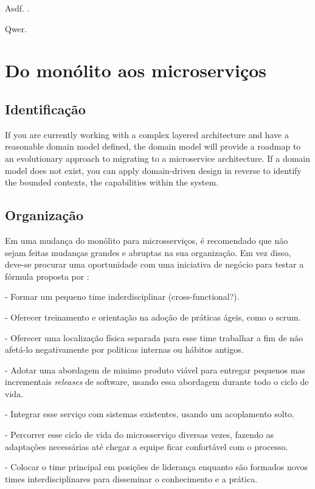 Asdf. \cite{oracle_microservices}.

Qwer. \cite{12factor}

\section{Do monólito aos microserviços}

\subsection{Identificação}

If you are currently working with a complex layered architecture and have a reasonable domain model defined, the domain model will provide a roadmap to an evolutionary approach to migrating to a microservice architecture. If a domain model does not exist, you can apply domain-driven design in reverse to identify the bounded contexts, the capabilities within the system. \cite{Familiar2015}


\subsection{Organização}

Em uma mudança do monólito para microsserviços, é recomendado que não sejam feitas mudanças grandes e abruptas na sua organização. Em vez disso, deve-se procurar uma oportunidade com uma iniciativa de negócio para testar a fórmula proposta por  : 

- Formar um pequeno time inderdisciplinar (cross-functional?).

- Oferecer treinamento e orientação na adoção de práticas ágeis, como o scrum.

- Oferecer uma localização física separada para esse time trabalhar a fim de não afetá-lo negativamente por politicas internas ou hábitos antigos.

- Adotar uma abordagem de minimo produto viável para entregar pequenos mas incrementais \emph{releases} de software, usando essa abordagem durante todo o ciclo de vida.

- Integrar esse serviço com sistemas existentes, usando um acoplamento solto.

- Percorrer esse ciclo de vida do microsserviço diversas vezes, fazendo as adaptações necessárias até chegar a equipe ficar confortável com o processo.

- Colocar o time principal em posições de liderança enquanto são formados novos times interdisciplinares para disseminar o conhecimento e a prática.